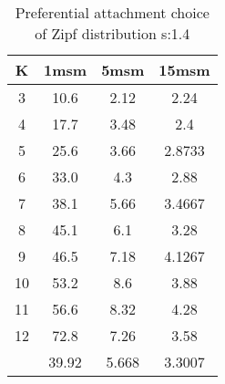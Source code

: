 \begin{table}[H]
\centering
\begin{tabular}{c|ccc}
K &1msm &5msm &15msm\\
\hline
3 & 10.6 & 2.12 & 2.24\\
4 & 17.7 & 3.48 & 2.4\\
5 & 25.6 & 3.66 & 2.8733\\
6 & 33.0 & 4.3 & 2.88\\
7 & 38.1 & 5.66 & 3.4667\\
8 & 45.1 & 6.1 & 3.28\\
9 & 46.5 & 7.18 & 4.1267\\
10 & 53.2 & 8.6 & 3.88\\
11 & 56.6 & 8.32 & 4.28\\
12 & 72.8 & 7.26 & 3.58\\
\hline
& 39.92 & 5.668 & 3.3007\\
\end{tabular}
\caption{Preferential attachment choice of Zipf distribution s:1.4}
\label{tab:s1.4}
\end{table}

